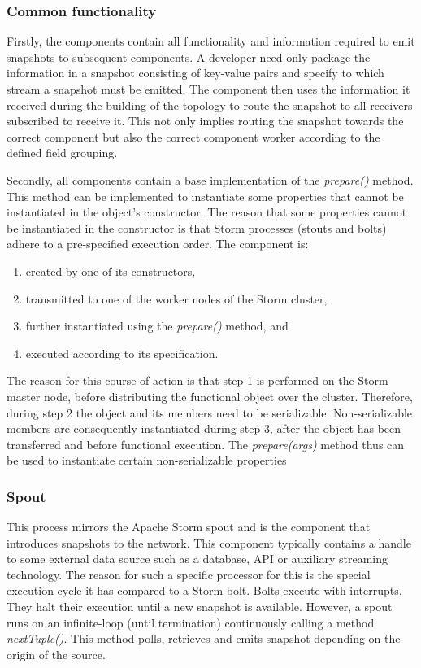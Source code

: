 \subsubsection*{Common functionality}
Firstly, the components contain all functionality and information required to emit snapshots to subsequent components. A developer need only package the information in a snapshot consisting of key-value pairs and specify to which stream a snapshot must be emitted. The component then uses the information it received during the building of the topology to route the snapshot to all receivers subscribed to receive it. This not only implies routing the snapshot towards the correct component but also the correct component worker according to the defined field grouping.

Secondly, all components contain a base implementation of the \emph{prepare()} method. This method can be implemented to instantiate some properties that cannot be instantiated in the object's constructor. The reason that some properties cannot be instantiated in the constructor is that Storm processes (stouts and bolts) adhere to a pre-specified execution order. The component is:
\begin{enumerate}
\nospace
\item created by one of its constructors,
\item transmitted to one of the worker nodes of the Storm cluster,
\item further instantiated using the \emph{prepare()} method, and
\item executed according to its specification.
\end{enumerate}
The reason for this course of action is that step 1 is performed on the Storm master node, before distributing the functional object over the cluster. Therefore, during step 2 the object and its members need to be serializable. Non-serializable members are consequently instantiated during step 3, after the object has been transferred and before functional execution. The \emph{prepare(args)} method thus can be used to instantiate certain non-serializable properties

\subsubsection*{Spout}
This process mirrors the Apache Storm spout and is the component that introduces snapshots to the network. This component typically contains a handle to some external data source such as a database, API or auxiliary streaming technology. The reason for such a specific processor for this is the special execution cycle it has compared to a Storm bolt. Bolts execute with interrupts. They halt their execution until a new snapshot is available. However, a spout runs on an infinite-loop (until termination) continuously calling a method \emph{nextTuple()}. This method polls, retrieves and emits snapshot depending on the origin of the source.

